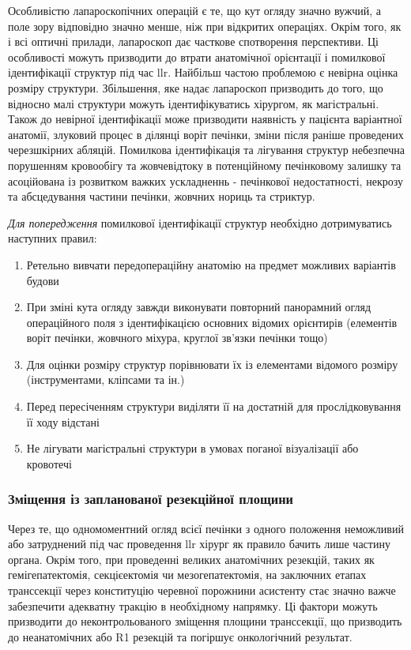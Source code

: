 \begin{refsection}
Особливістю лапароскопічних операцій є те, що кут огляду значно вужчий, а поле зору відповідно значно менше, ніж при відкритих операціях. Окрім того, як і всі оптичні прилади, лапароскоп дає часткове спотворення перспективи. Ці особливості можуть призводити до втрати анатомічної орієнтації і помилкової ідентифікації структур під час \acrshort{llr}. Найбільш частою проблемою є невірна оцінка розміру структури. Збільшення, яке надає лапароскоп призводить до того, що відносно малі структури можуть ідентифікуватись хірургом, як магістральні. Також до невірної ідентифікації може призводити наявність у пацієнта варіантної анатомії, злуковий процес в ділянці воріт печінки, зміни після раніше проведених черезшкірних абляцій. Помилкова ідентифікація та лігування структур небезпечна порушенням кровообігу та жовчевідтоку в потенційному печінковому залишку та асоційована із розвитком важких ускладненнь - печінкової недостатності, некрозу та абсцедування частини печінки, жовчних нориць та стриктур.

\textit{Для попередження} помилкової ідентифікації структур необхідно дотримуватись наступних правил:
\begin{enumerate}
    \item Ретельно вивчати передопераційну анатомію на предмет можливих варіантів будови
    \item При зміні кута огляду завжди виконувати повторний панорамний огляд операційного поля з ідентифікацією основних відомих орієнтирів (елементів воріт печінки, жовчного міхура, круглої зв'язки печінки тощо) 
    \item Для оцінки розміру структур порівнювати їх із елементами відомого розміру (інструментами, кліпсами та ін.)
    \item Перед пересіченням структури виділяти її на достатній для прослідковування її ходу відстані
    \item Не лігувати магістральні структури в умовах поганої візуалізації або кровотечі
\end{enumerate}


\subsubsection{Зміщення із запланованої резекційної площини}

Через те, що одномоментний огляд всієї печінки з одного положення неможливий або затруднений під час проведення \acrshort{llr} хірург як правило бачить лише частину органа. Окрім того, при проведенні великих анатомічних резекцій, таких як гемігепатектомія, секцієектомія чи мезогепатектомія, на заключних етапах транссекції через конституцію черевної порожнини асистенту стає значно важче забезпечити адекватну тракцію в необхідному напрямку. Ці фактори можуть призводити до неконтрольованого зміщення площини транссекції, що призводить до неанатомічних або R1 резекцій та погіршує онкологічний результат. 


\end{refsection}

